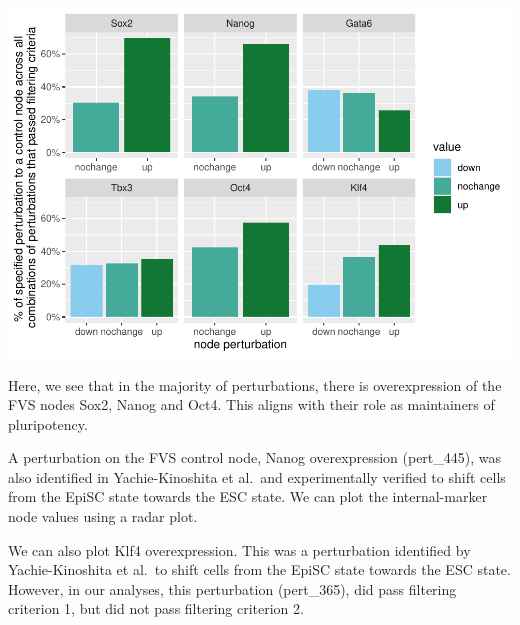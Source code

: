 \documentclass[
]{book}
\begin{document}
\begin{center}\includegraphics{_main_files/figure-latex/unnamed-chunk-29-1} \end{center}

Here, we see that in the majority of perturbations, there is overexpression of the FVS nodes Sox2, Nanog and Oct4. This aligns with their role as maintainers of pluripotency.

A perturbation on the FVS control node, Nanog overexpression (pert\_445), was also identified in Yachie-Kinoshita et al.~and experimentally verified to shift cells from the EpiSC state towards the ESC state. We can plot the internal-marker node values using a radar plot.

We can also plot Klf4 overexpression. This was a perturbation identified by Yachie-Kinoshita et al.~to shift cells from the EpiSC state towards the ESC state. However, in our analyses, this perturbation (pert\_365), did pass filtering criterion 1, but did not pass filtering criterion 2.
\end{document}
